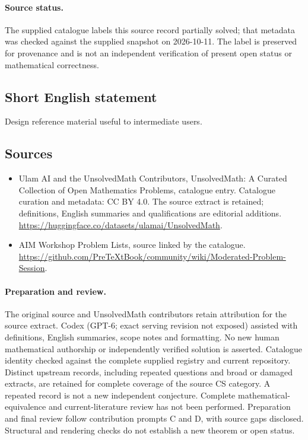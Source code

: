 \documentclass[11pt]{article}
\begin{document}
\paragraph{Source status.}
The supplied catalogue labels this source record partially solved; that metadata was checked against the supplied snapshot on 2026-10-11. The label is preserved for provenance and is not an independent verification of present open status or mathematical correctness.
\subsection{Short English statement}
Design reference material useful to intermediate users.
\subsection{Sources}
\begin{itemize}
\item[\hypertarget{source:statement:1}{S1}] Ulam AI and the UnsolvedMath Contributors, UnsolvedMath: A Curated Collection of Open Mathematics Problems, catalogue entry. Catalogue curation and metadata: CC BY 4.0. The source extract is retained; definitions, English summaries and qualifications are editorial additions.
\url{https://huggingface.co/datasets/ulamai/UnsolvedMath}.
\item[\hypertarget{source:statement:2}{S2}] AIM Workshop Problem Lists, source linked by the catalogue.
\url{https://github.com/PreTeXtBook/community/wiki/Moderated-Problem-Session}.
\end{itemize}
\paragraph{Preparation and review.}
The original source and UnsolvedMath contributors retain attribution for the source extract. Codex (GPT-6; exact serving revision not exposed) assisted with definitions, English summaries, scope notes and formatting. No new human mathematical authorship or independently verified solution is asserted. Catalogue identity checked against the complete supplied registry and current repository. Distinct upstream records, including repeated questions and broad or damaged extracts, are retained for complete coverage of the source CS category. A repeated record is not a new independent conjecture. Complete mathematical-equivalence and current-literature review has not been performed. Preparation and final review follow contribution prompts C and D, with source gaps disclosed. Structural and rendering checks do not establish a new theorem or open status.
\label{end:statement}
\end{document}
